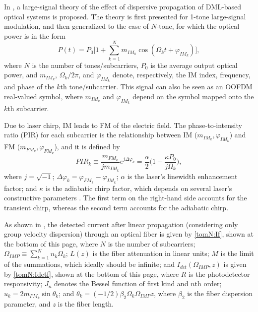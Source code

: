 \documentclass[journal]{IEEEtran}
\begin{document}
\setcounter{equation}{0}
In \cite{eva}, a large-signal theory of the effect of dispersive propagation of DML-based optical systems is proposed. The theory is first presented for 1-tone large-signal modulation, and then generalized to the case of $N$-tone, for which the optical power is in the form
\begin{equation} \label{Pt}
P(t) = P_0\Bigg[1 + \sum_{k=1}^N m_{IM_k}\cos(\Omega_k t + \varphi_{IM_k})\Bigg],
\end{equation}
where $N$ is the number of tones/subcarriers, $P_0$ is the average output optical power, and $m_{IM_k}$, $\Omega_k/2\pi$, and $\varphi_{IM_k}$ denote, respectively, the IM index, frequency, and phase of the $k$th tone/subcarrier. This signal can also be seen as an OOFDM real-valued symbol, where $m_{IM_k}$ and $\varphi_{IM_k}$ depend on the symbol mapped onto the $k$th subcarrier. 

Due to laser chirp, IM leads to FM of the electric field. The phase-to-intensity ratio (PIR) \cite{eva} for each subcarrier is the relationship between IM ($m_{IM_k}, \varphi_{IM_k}$) and FM ($m_{FM_k}, \varphi_{FM_k}$), and it is defined by
\begin{equation} \label{PIRk}
PIR_k \equiv \frac{m_{FM_k}}{jm_{IM_k}}e^{j\Delta\varphi_k} = \frac{\alpha}{2}\bigg(1 + \frac{\kappa P_0}{j\Omega_k}\bigg),
\end{equation}
where $j=\sqrt{-1}$; $\Delta\varphi_k = \varphi_{FM_k} - \varphi_{IM_k}$; $\alpha$ is the laser's linewidth enhancement factor; and $\kappa$ is the adiabatic chirp factor, which depends on several laser's constructive parameters \cite{corvini}. The first term on the right-hand side accounts for the transient chirp, whereas the second term accounts for the adiabatic chirp. 

As shown in \cite{eva}, the detected current after linear propagation (considering only group velocity dispersion) through an optical fiber is given by \eqref{tomN:If}, shown at the bottom of this page, where $N$ is the number of subcarriers; $\Omega_{IMP} \equiv \sum_{k = 1}^N n_k\Omega_k$; $L(z)$ is the fiber attenuation in linear units; $M$ is the limit of the summations, which ideally should be infinite; and $I_{det}(\Omega_{IMP},z)$ is given by \eqref{tomN:Idetf}, shown at the bottom of this page, where $R$ is the photodetector responsivity; $J_n$ denotes the Bessel function of first kind and $n$th order; $u_k = 2m_{FM_k}\sin\theta_k$; and $\theta_k = (-1/2)\beta_2\Omega_k\Omega_{IMP}z$, where $\beta_2$ is the fiber dispersion parameter, and \emph{z} is the fiber length. 
\end{document}
